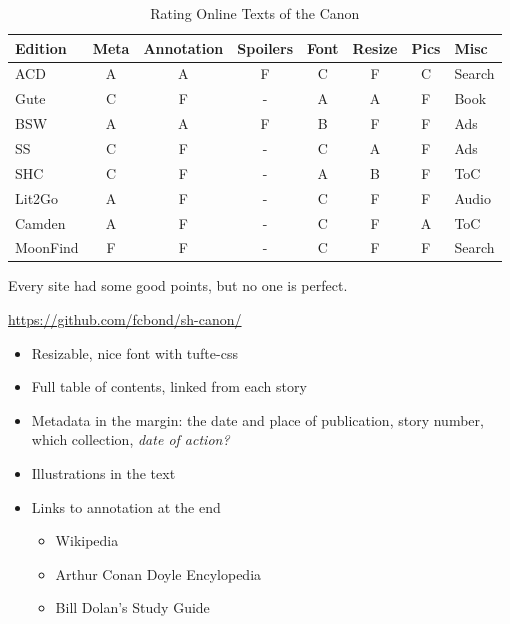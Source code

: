 \documentclass[a4paper,landscape,headrule,footrule,xetex]{foils}
\newcommand{\todo}{\marginpar{ToDo}}
\begin{document}
\begin{table}
\caption{Rating Online Texts of the Canon}
\bigskip
\label{tab:editions}
\begin{tabular}{lccccccl}
Edition & Meta & Annotation & Spoilers & Font & Resize & Pics & Misc\\
\hline
ACD    & A & A & F & C & F & C & Search\\
Gute   & C & F & - & A & A & F & Book \\
BSW    & A & A & F & B & F & F & Ads \\
SS     & C & F & - & C & A & F & Ads \\
SHC      & C & F & - & A & B & F & ToC \\
Lit2Go   & A & F & - & C & F & F & Audio \\
Camden   & A & F & - & C & F & A & ToC \\
MoonFind & F & F & - & C & F & F & Search 
\end{tabular}
\end{table}

Every site had some good points, but no one is perfect.

\begin{center}
  \url{https://github.com/fcbond/sh-canon/}
\end{center}

\begin{itemize}
\item Resizable, nice font with tufte-css
\item Full table of contents, linked from each story
\item Metadata in the margin: the date and place of publication, story
  number, which collection, \textit{date of action?}
\item Illustrations in the text\todo 
\item Links to annotation at the end
  \begin{itemize}
  \item Wikipedia
  \item Arthur Conan Doyle Encylopedia
  \item Bill Dolan's Study Guide
  \end{itemize}
\end{itemize}
\end{document}
